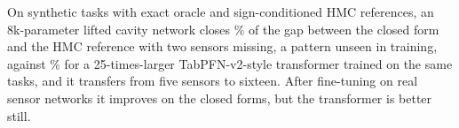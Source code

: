 On synthetic tasks with exact oracle and sign-conditioned HMC references, an 8k-parameter lifted cavity network closes
\GapliftOne\% of the gap between the closed form and the HMC reference with two sensors missing, a pattern
unseen in training, against \Gappfn\% for a 25-times-larger TabPFN-v2-style transformer trained on the same tasks,
and it transfers from five sensors to sixteen. After fine-tuning on real sensor networks it improves on the closed
forms, but the transformer is better still.

